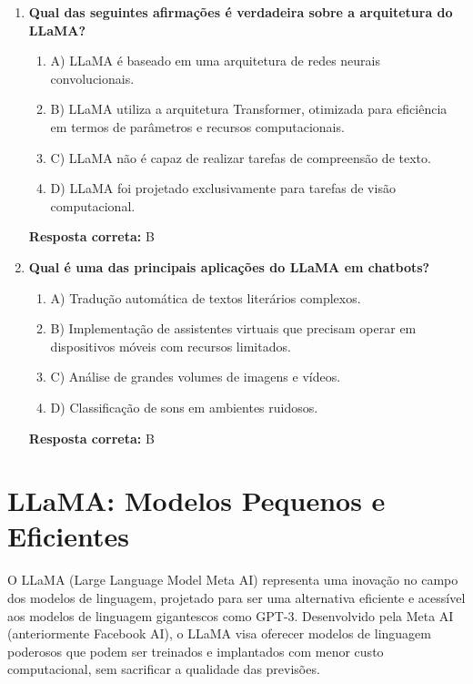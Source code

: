 \documentclass[14pt,a4paper,oneside]{book}
\begin{document}
\begin{enumerate}
	\item \textbf{Qual das seguintes afirmações é verdadeira sobre a arquitetura do LLaMA?}
	\begin{enumerate}[label=\alph*)]
		\item A) LLaMA é baseado em uma arquitetura de redes neurais convolucionais.
		\item B) LLaMA utiliza a arquitetura Transformer, otimizada para eficiência em termos de parâmetros e recursos computacionais.
		\item C) LLaMA não é capaz de realizar tarefas de compreensão de texto.
		\item D) LLaMA foi projetado exclusivamente para tarefas de visão computacional.
	\end{enumerate}
	\vspace{5mm}
	\textbf{Resposta correta:} B
	
	\item \textbf{Qual é uma das principais aplicações do LLaMA em chatbots?}
	\begin{enumerate}[label=\alph*)]
		\item A) Tradução automática de textos literários complexos.
		\item B) Implementação de assistentes virtuais que precisam operar em dispositivos móveis com recursos limitados.
		\item C) Análise de grandes volumes de imagens e vídeos.
		\item D) Classificação de sons em ambientes ruidosos.
	\end{enumerate}
	\vspace{5mm}
	\textbf{Resposta correta:} B
	
\end{enumerate}


\chapter{LLaMA: Modelos Pequenos e Eficientes}

O LLaMA (Large Language Model Meta AI) representa uma inovação no campo dos modelos de linguagem, projetado para ser uma alternativa eficiente e acessível aos modelos de linguagem gigantescos como GPT-3. Desenvolvido pela Meta AI (anteriormente Facebook AI), o LLaMA visa oferecer modelos de linguagem poderosos que podem ser treinados e implantados com menor custo computacional, sem sacrificar a qualidade das previsões.
\end{document}
